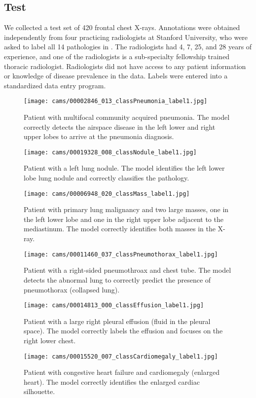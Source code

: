 \documentclass{article}
\begin{document}
\subsection{Test}
We collected a test set of 420 frontal chest X-rays. Annotations were obtained independently from four practicing radiologists at Stanford University, who were asked to label all 14 pathologies in \citet{Wang2017}. The radiologists had 4, 7, 25, and 28 years of experience, and one of the radiologists is a sub-specialty fellowship trained thoracic radiologist. Radiologists did not have access to any patient information or knowledge of disease prevalence in the data. Labels were entered into a standardized data entry program. 
\begin{figure*}[ht!]
\centering
\begin{subfigure}[t]{0.3\textwidth}
\texttt{[image: cams/00002846\_013\_classPneumonia\_label1.jpg]}
\caption{Patient with multifocal community acquired pneumonia. The model correctly detects the airspace disease in the left lower and right upper lobes to arrive at the pneumonia diagnosis.}
\label{fig:cam_pneumonia}
\end{subfigure}\hfill
\begin{subfigure}[t]{0.3\textwidth}
\texttt{[image: cams/00019328\_008\_classNodule\_label1.jpg]}
\caption{Patient with a left lung nodule. The model identifies the left lower lobe lung nodule and correctly classifies the pathology.}
\label{fig:cam_nodule}
\end{subfigure}\hfill
\begin{subfigure}[t]{0.3\textwidth}
\texttt{[image: cams/00006948\_020\_classMass\_label1.jpg]}
\caption{Patient with primary lung malignancy and two large masses, one in the left lower lobe and one in the right upper lobe adjacent to the mediastinum. The model correctly identifies both masses in the X-ray.}
\label{fig:cam_mass}
\end{subfigure}

\bigskip
\begin{subfigure}[t]{0.3\textwidth}
\texttt{[image: cams/00011460\_037\_classPneumothorax\_label1.jpg]}
\caption{Patient with a right-sided pneumothroax and chest tube. The model detects the abnormal lung to correctly predict the presence of pneumothorax (collapsed lung).}
\label{fig:cam_pneumothorax}
\end{subfigure}\hfill
\begin{subfigure}[t]{0.3\textwidth}
\texttt{[image: cams/00014813\_000\_classEffusion\_label1.jpg]} 
\caption{Patient with a large right pleural effusion (fluid in the pleural space). The model correctly labels the effusion and focuses on the right lower chest. }
\label{fig:cam_effusion}
\end{subfigure}\hfill
\begin{subfigure}[t]{0.3\textwidth}
\centering
\texttt{[image: cams/00015520\_007\_classCardiomegaly\_label1.jpg]}
\caption{Patient with congestive heart failure and cardiomegaly (enlarged heart). The model correctly identifies the enlarged cardiac silhouette. }
\label{fig:cam_cardiomegaly}
\end{subfigure}


\end{figure*}
\end{document}
